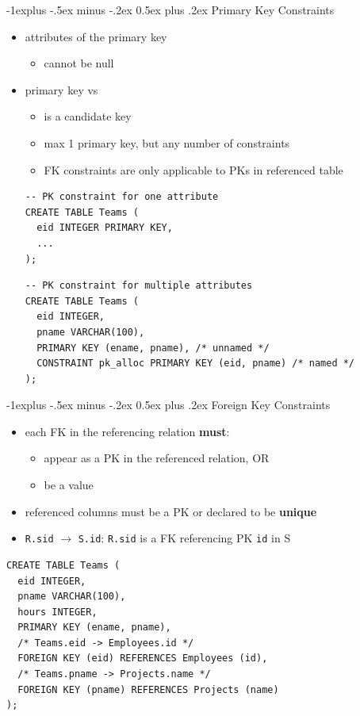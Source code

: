 \documentclass[10pt, landscape]{article}
\makeatletter
\renewcommand{\subsection}{\@startsection{subsection}{2}{0mm}%
  {-1explus -.5ex minus -.2ex}%
  {0.5ex plus .2ex}%
{\normalfont\normalsize\bfseries}}
\makeatother
\begin{document}
\begin{multicols}{3}
  \subsection{Primary Key Constraints}
  \begin{itemize}
    \item {} attributes of the primary key 
      \begin{itemize}
        \item cannot be null
      \end{itemize}
    \item primary key vs 
      \begin{itemize}
        \item {} is a candidate key
        \item max 1 primary key, but any number of  constraints
        \item FK constraints are only applicable to PKs in referenced table
      \end{itemize}
      \begin{lstlisting}[style=mySQL]
-- PK constraint for one attribute
CREATE TABLE Teams (
  eid INTEGER PRIMARY KEY, 
  ... 
);
      \end{lstlisting}
      \begin{lstlisting}[style=mySQL]
-- PK constraint for multiple attributes
CREATE TABLE Teams (
  eid INTEGER,
  pname VARCHAR(100),
  PRIMARY KEY (ename, pname), /* unnamed */
  CONSTRAINT pk_alloc PRIMARY KEY (eid, pname) /* named */
);
      \end{lstlisting}
  \end{itemize}

  \subsection{Foreign Key Constraints}
  \begin{itemize}
    \item each FK in the referencing relation \textbf{must}:
      \begin{itemize}
        \item appear as a PK in the referenced relation, OR
        \item be a  value
      \end{itemize}
    \item referenced columns must be a PK or declared to be \textbf{unique}
    \item \texttt{R.sid} $\rightarrow$ \texttt{S.id}: \texttt{R.sid} is a FK referencing PK \texttt{id} in S
  \end{itemize}
  \begin{lstlisting}[style=mySQL]
CREATE TABLE Teams (
  eid INTEGER,
  pname VARCHAR(100),
  hours INTEGER,
  PRIMARY KEY (ename, pname),
  /* Teams.eid -> Employees.id */
  FOREIGN KEY (eid) REFERENCES Employees (id), 
  /* Teams.pname -> Projects.name */
  FOREIGN KEY (pname) REFERENCES Projects (name)
);
  \end{lstlisting}


\end{multicols}
\end{document}
